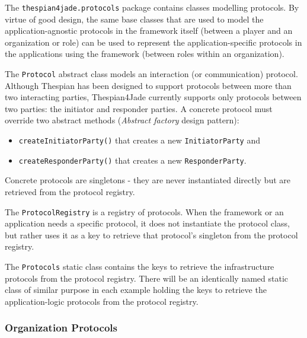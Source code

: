 The \texttt{thespian4jade.protocols} package contains classes modelling protocols.
By virtue of good design, the same base classes that are used to model the application-agnostic protocols in the framework itself (between a player and an organization or role) can be used to represent the application-specific protocols in the applications using the framework (between roles within an organization). 

The \texttt{Protocol} abstract class models an interaction (or communication) protocol.
Although Thespian has been designed to support protocols between more than two interacting parties, Thespian4Jade currently supports only protocols between two parties: the initiator and responder parties.
A concrete protocol must override two abstract methods (\textit{Abstract factory} design pattern):
\begin{itemize}
	\item \texttt{createInitiatorParty()} that creates a new \texttt{InitiatorParty} and
	\item \texttt{createResponderParty()} that creates a new \texttt{ResponderParty}.
\end{itemize}
Concrete protocols are singletons - they are never instantiated directly but are retrieved from the protocol registry.

The \texttt{ProtocolRegistry} is a registry of protocols.
When the framework or an application needs a specific protocol, it does not instantiate the protocol class, but rather uses it as a key to retrieve that protocol's singleton from the protocol registry. 

The \texttt{Protocols} static class contains the keys to retrieve the infrastructure protocols from the protocol registry.
There will be an identically named static class of similar purpose in each example holding the keys to retrieve the application-logic protocols from the protocol registry. 

\subsubsection{Organization Protocols}

